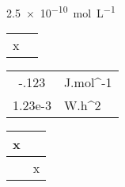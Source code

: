 \documentclass{article}
\begin{document}
\SI{2.5e-10}{mol.L^{-1}}


\begin{tabular}{Ss}
    \\  %
x & \\  %
\end{tabular}

\vrule
\begin{tabular}{Ss}
  -.123 & J.mol^{-1} \\
  1.23e-3 & W.h^{2} \\
\end{tabular}%
\vrule

\vrule
\begin{tabular}{Ss}
   \\\hline
   x & \\\hline
   & x \\
\end{tabular}%
\vrule
\end{document}
